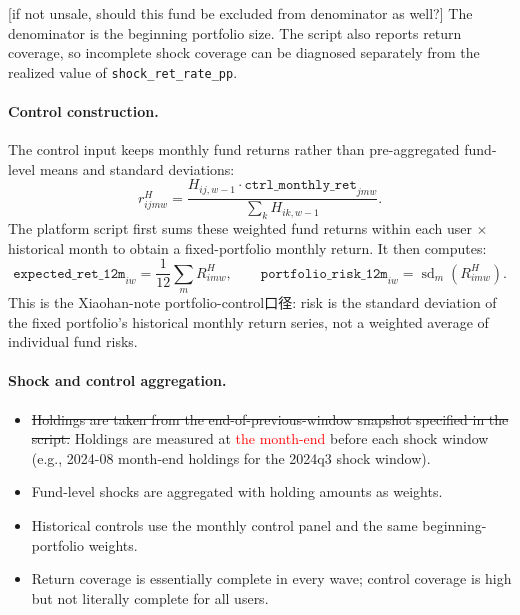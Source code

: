 \documentclass[11pt,letterpaper,english,final]{article}
\begin{document}
{\color{cyan}[if not unsale, should this fund be excluded from denominator as well?]}
The denominator is the beginning portfolio size. The script also reports return coverage, so incomplete shock coverage can be diagnosed separately from the realized value of \texttt{shock\_ret\_rate\_pp}.

\paragraph{Control construction.}
The control input keeps monthly fund returns rather than pre-aggregated fund-level means and standard deviations:
\[
r^{H}_{ijmw}
= \frac{H_{ij,w-1} \cdot \texttt{ctrl\_monthly\_ret}_{jmw}}
        {\sum_k H_{ik,w-1}}.
\]
The platform script first sums these weighted fund returns within each user $\times$ historical month to obtain a fixed-portfolio monthly return. It then computes:
\[
\texttt{expected\_ret\_12m}_{iw}
= \frac{1}{12}\sum_m R^H_{imw},
\qquad
\texttt{portfolio\_risk\_12m}_{iw}
= \operatorname{sd}_m(R^H_{imw}).
\]
This is the Xiaohan-note portfolio-control口径: risk is the standard deviation of the fixed portfolio's historical monthly return series, not a weighted average of individual fund risks.

\paragraph{Shock and control aggregation.}

\begin{itemize}
\item \sout{Holdings are taken from the end-of-previous-window snapshot specified in the script.}  Holdings are measured at \textcolor{red}{the month-end} before each shock window
(e.g., 2024-08 month-end holdings for the 2024q3 shock window).
\item Fund-level shocks are aggregated with holding amounts as weights.
\item Historical controls use the monthly control panel and the same beginning-portfolio weights.
\item Return coverage is essentially complete in every wave; control coverage is high but not literally complete for all users.
\end{itemize}
\end{document}
